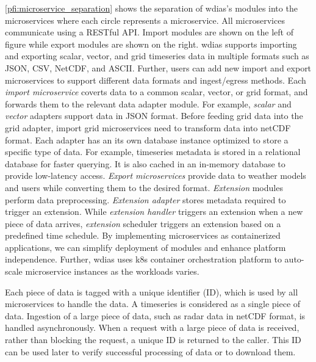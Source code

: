 \documentclass[conference]{IEEEtran}
\newcommand{\db}[1]{\textcolor{blue!40}{#1}}
\begin{document}
\cref{pfi:microservice_separation} shows the separation of \acrshort{wdias}'s modules into the microservices where each circle represents a microservice. All microservices communicate using a RESTful API. Import modules are shown on the left of figure while export modules are shown on the right. \acrshort{wdias} supports importing
and exporting scalar, vector, and grid timeseries data in multiple formats such as JSON, CSV, NetCDF, and ASCII.
Further, users can add new import and export microservices to support different data formats and ingest/egress methods. Each \emph{import microservice} coverts data to a common scalar, vector, or grid format, and forwards them to the relevant data adapter module. For example, \emph{scalar} and \emph{vector} adapters support data in JSON format. Before feeding grid data into the grid adapter, import grid microservices need to transform data into \acrlong{netCDF} format. Each adapter has an its own database instance optimized to store a specific type of data. For example, timeseries metadata is stored in a relational database for faster querying. It is also cached in an in-memory database to provide low-latency access. \emph{Export microservices} provide data to weather models and users while converting them to the desired format. \emph{Extension} modules perform data preprocessing. \emph{Extension adapter} stores metadata required to trigger an extension. While \emph{extension handler} triggers an extension when a new piece of data arrives, \emph{extension} scheduler triggers an extension based on a predefined time schedule. By implementing microservices as containerized applications, we can simplify deployment of modules and enhance platform independence. Further, \acrshort{wdias} uses \acrfull{k8s} \cite{LinuxFoundationProduction-GradeKubernetes} container orchestration platform to auto-scale microservice instances as the workloads varies.


Each piece of data is tagged with a unique identifier (ID), which is used by all microservices to handle the data. A timeseries is considered as a single piece of data. Ingestion of a large piece of data, such as radar data in \acrshort{netCDF} format, is handled asynchronously. When a request with a large piece of data is received, rather than blocking the request, a unique ID is returned to the caller. This ID can be used later to verify successful processing of data or to download them.
\end{document}

